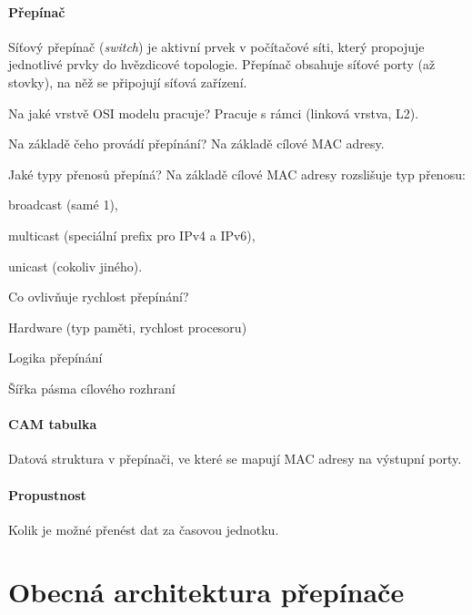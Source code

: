 \paragraph*{Přepínač} Síťový přepínač (\textit{switch}) je aktivní prvek v počítačové síti, který propojuje jednotlivé prvky do hvězdicové topologie. Přepínač obsahuje síťové porty (až stovky), na něž se připojují síťová zařízení. \begin{compactitem}
    \item Na jaké vrstvě OSI modelu pracuje? Pracuje s rámci (linková vrstva, L2).
    \item Na základě čeho provádí přepínání? Na základě cílové MAC adresy.
    \item Jaké typy přenosů přepíná? Na základě cílové MAC adresy rozslišuje typ přenosu: \begin{compactitem}
        \item broadcast (samé 1),
        \item multicast (speciální prefix pro IPv4 a IPv6),
        \item unicast (cokoliv jiného).
    \end{compactitem}
    \item Co ovlivňuje rychlost přepínání? \begin{compactitem}
        \item Hardware (typ paměti, rychlost procesoru)
        \item Logika přepínání
        \item Šířka pásma cílového rozhraní
    \end{compactitem}
\end{compactitem}

\paragraph*{CAM tabulka} Datová struktura v přepínači, ve které se mapují MAC adresy na výstupní porty.

\paragraph*{Propustnost} Kolik je možné přenést dat za časovou jednotku.


\section{Obecná architektura přepínače}

